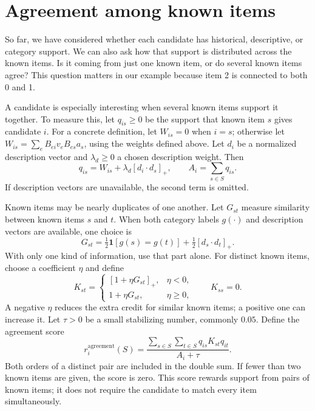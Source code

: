 \documentclass[11pt,a4paper]{article}
\numberwithin{equation}{section}
\begin{document}
\section{Agreement among known items}\label{agreement}
So far, we have considered whether each candidate has historical, descriptive, or category
support. We can also ask how that support is distributed across the known items. Is it
coming from just one known item, or do several known items agree? This question matters
in our example because item 2 is connected to both 0 and 1.

A candidate is especially interesting when several known items support it together. To
measure this, let $q_{is}\ge0$ be the support that known item $s$ gives candidate $i$.
For a concrete definition, let $W_{is}=0$ when $i=s$; otherwise let
$W_{is}=\sum_e B_{ei}v_e B_{es}a_s$, using the weights defined above. Let $d_i$ be a
normalized description vector and $\lambda_d\ge0$ a chosen description weight. Then
\begin{equation}
 q_{is}=W_{is}+\lambda_d[d_i\cdot d_s]_+,\qquad
 A_i=\sum_{s\in S}q_{is}.
\end{equation}
If description vectors are unavailable, the second term is omitted.

Known items may be nearly duplicates of one another. Let $G_{st}$ measure similarity
between known items $s$ and $t$. When both category labels $g(\cdot)$ and description
vectors are available, one choice is
\begin{equation}
 G_{st}=\tfrac12\mathbf1[g(s)=g(t)]+\tfrac12[d_s\cdot d_t]_+.
\end{equation}
With only one kind of information, use that part alone. For distinct known items, choose a coefficient $\eta$ and define
\begin{equation}
 K_{st}=\begin{cases}[1+\eta G_{st}]_+,&\eta<0,\\1+\eta G_{st},&\eta\ge0,\end{cases}
 \qquad K_{ss}=0.
\end{equation}
A negative $\eta$ reduces the extra credit for similar known items; a positive one can
increase it. Let $\tau>0$ be a small stabilizing number, commonly $0.05$. Define the
agreement score
\begin{equation}\label{agreementeq}
 r_i^{\mathrm{agreement}}(S)=
 \frac{\displaystyle\sum_{s\in S}\sum_{t\in S}q_{is}K_{st}q_{it}}{A_i+\tau}.
\end{equation}
Both orders of a distinct pair are included in the double sum. If fewer than two known
items are given, the score is zero. This score rewards support from pairs of known items;
it does not require the candidate to match every item simultaneously.
\end{document}
